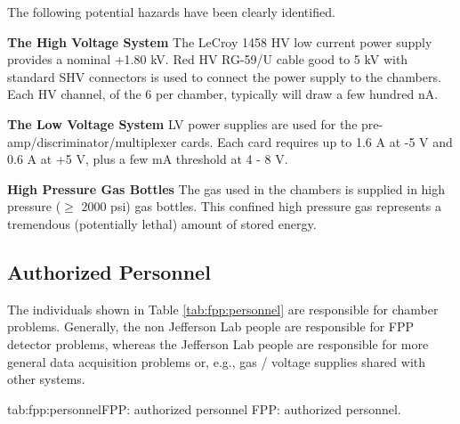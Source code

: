 \begin{safetyen}{10}{10}
The following potential hazards have been clearly identified.

\begin{description}

\item {\bf The High Voltage System}
The LeCroy 1458 HV low current power supply provides a nominal
+1.80 kV.
Red HV RG-59/U cable good to 5 kV with standard SHV connectors is used
to connect the power supply to the chambers.
Each HV channel, of the 6 per chamber, typically will draw a few hundred nA.

\item {\bf The Low Voltage System}
LV power supplies are used for the pre-amp/discriminator/multiplexer
cards.
Each card requires up to 
1.6 A at -5 V and 0.6 A at +5 V, plus a few mA threshold at 4 - 8 V.

\item{\bf High Pressure Gas Bottles} The  gas used 
in the chambers is supplied in high pressure ($\ge$ 2000 psi) gas
bottles. This confined high pressure gas represents a tremendous
(potentially lethal) amount of stored energy.
\end{description}
\end{safetyen}

\begin{safetyen}{10}{15}
\section{Authorized Personnel}
\end{safetyen}

The individuals shown in Table \ref{tab:fpp:personnel} are responsible for 
chamber problems. Generally, the non Jefferson Lab people are responsible for
FPP detector problems, whereas the Jefferson Lab people are responsible
for more general data acquisition problems or, e.g., gas / voltage supplies
shared with other systems.
\begin{namestab}{tab:fpp:personnel}{FPP: authorized personnel}{%
      FPP: authorized personnel.}
  \SirishNanda{}
  \JackSegal{}
\end{namestab}

